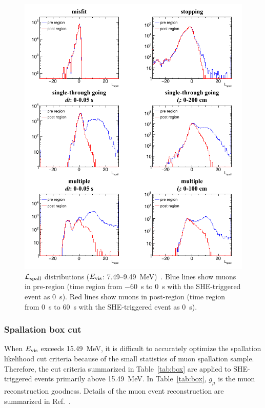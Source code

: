 \begin{figure}[tbp]
	\centering
	\includegraphics[width=16cm]{Figures/Selection/L_spall}
	\caption[$\mathcal{L}_{\rm spall}$ distributions ($E_{\rm vis}$: 7.49--9.49~MeV)]{
	$\mathcal{L}_{\rm spall}$ distributions ($E_{\rm vis}$: 7.49--9.49~MeV)~\cite{2023HaradaPhD}.
	Blue lines show muons in pre-region (time region from $-$60~s to 0~s with the SHE-triggered event as 0~s).
	Red lines show muons in post-region (time region from 0~s to 60~s with the SHE-triggered event as 0~s).
	}\label{L_spall}
\end{figure}

\clearpage

\subsubsection{Spallation box cut}\label{Sec_box}
\vs\hs
When $E_{\rm vis}$ exceeds 15.49~MeV, it is difficult to accurately optimize the spallation likelihood cut criteria because of the small statistics of muon spallation sample.
Therefore, the cut criteria summarized in Table~\ref{tab:box} are applied to SHE-triggered events primarily above 15.49~MeV.
In Table~\ref{tab:box}, $g_{\mu}$ is the muon reconstruction goodness.
Details of the muon event reconstruction are summarized in Ref.~\cite{2023HaradaPhD}.

